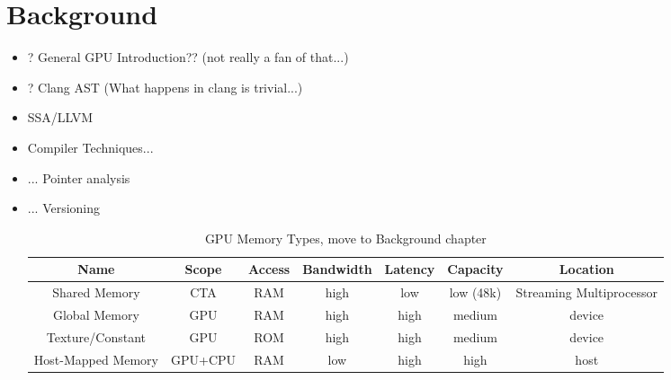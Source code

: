 \chapter{Background}
\begin{itemize}
	\item ? General GPU Introduction?? (not really a fan of that...)
	\item ? Clang AST (What happens in clang is trivial...)
	\item SSA/LLVM
	\item Compiler Techniques...
	\item ... Pointer analysis
	\item ... Versioning

\begin{table}
	\begin{tabular}{|c|c|c|c|c|c|c|}
		\hline 
		Name & Scope & Access & Bandwidth & Latency & Capacity & Location \\ 
		\hline 
		Shared Memory & CTA & RAM & high & low & low (48k) & Streaming Multiprocessor \\ 
		\hline 
		Global Memory & GPU & RAM & high & high & medium & device \\ 
		\hline 
		Texture/Constant & GPU & ROM & high & high & medium & device \\ 
		\hline 
		Host-Mapped Memory & GPU+CPU & RAM & low & high & high & host \\ 
		\hline 
	\end{tabular} 
	\caption{GPU Memory Types, move to Background chapter}
	\label{GPUMemTable}
\end{table}
\end{itemize}